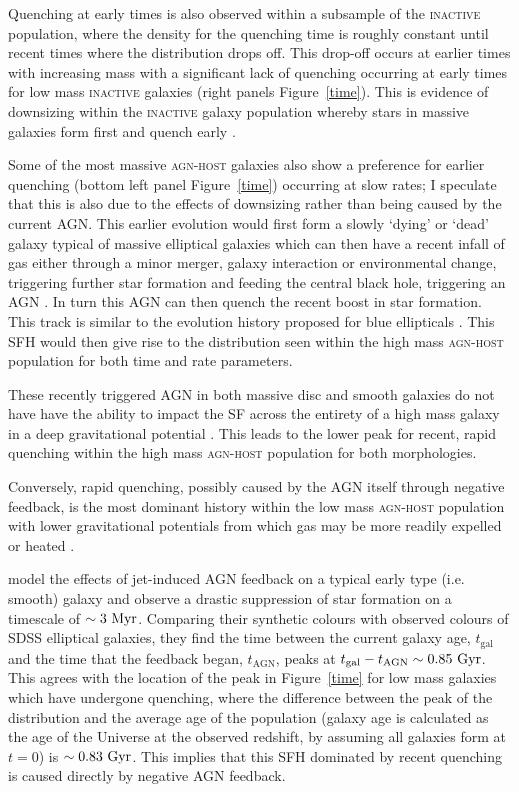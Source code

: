 Quenching at early times is also observed within a subsample of the \textsc{inactive} population, where the density for the quenching time is roughly constant until recent times where the distribution drops off.  This drop-off occurs at earlier times with increasing mass with a significant lack of quenching occurring at early times for low mass \textsc{inactive} galaxies (right panels Figure~\ref{time}). This is evidence of downsizing within the \textsc{inactive} galaxy population whereby stars in massive galaxies form first and quench early \citep{Cowie96, Thomas10}. 

Some of the most massive \textsc{agn-host} galaxies also show a preference for earlier quenching (bottom left panel Figure~\ref{time}) occurring at slow rates; I speculate that this is also due to the effects of downsizing rather than being caused by the current AGN. This earlier evolution would first form a slowly `dying' or `dead' galaxy typical of massive elliptical galaxies which can then have a recent infall of gas either through a minor merger, galaxy interaction or environmental change, triggering further star formation and feeding the central black hole, triggering an AGN \citep{kaviraj14b}. In turn this AGN can then quench the recent boost in star formation. This track is similar to the evolution history proposed for blue ellipticals \citep{Kaviraj13, McIntosh14, Haines15}. This SFH would then give rise to the distribution seen within the high mass \textsc{agn-host} population for both time and rate parameters.


These recently triggered AGN in both massive disc and smooth galaxies do not have have the ability to impact the SF across the entirety of a high mass galaxy in a deep gravitational potential \citep{ishibashi12, Zinn13}. This leads to the lower peak for recent, rapid quenching within the high mass \textsc{agn-host} population for both morphologies. 

Conversely, rapid quenching, possibly caused by the AGN itself through negative feedback, is the most dominant history within the low mass \textsc{agn-host} population with lower gravitational potentials from which gas may be more readily expelled or heated \citep{tortora09}. 

\cite{tortora09} model the effects of jet-induced AGN feedback on a typical early type (i.e. smooth) galaxy and observe a drastic suppression of star formation on a timescale of $\sim 3 ~\rm{Myr}$. Comparing their synthetic colours with observed colours of SDSS elliptical galaxies, they find the time between the current galaxy age, $t_\mathrm{gal}$ and the time that the feedback began, $t_\mathrm{AGN}$, peaks at $t_\mathrm{gal} - t_\mathrm{AGN} \sim 0.85 ~\rm{Gyr}$. This agrees with the location of the peak in Figure~\ref{time} for low mass galaxies  which have undergone quenching, where the difference between the peak of the distribution and the average age of the population (galaxy age is calculated as the age of the Universe at the observed redshift, by assuming all galaxies form at $t=0$) is $\sim0.83 ~\rm{Gyr}$. This implies that this SFH dominated by recent quenching is caused directly by negative AGN feedback.


